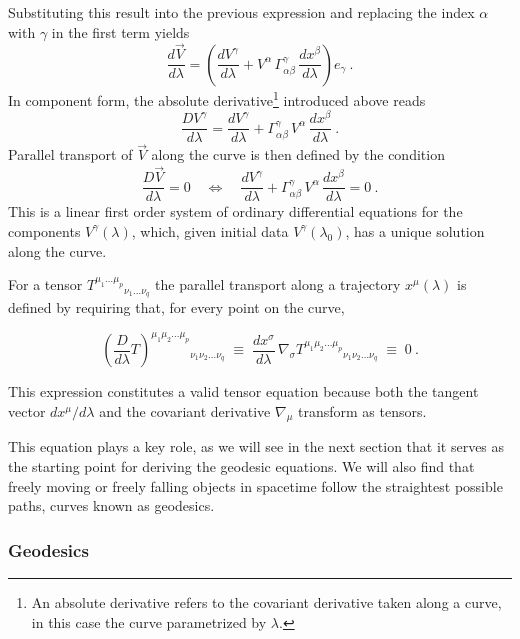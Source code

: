 Substituting this result into the previous expression and replacing the index $\alpha$ with $\gamma$ in the first term yields
\begin{equation}
\frac{d\vec{V}}{d\lambda}
= \left(\frac{dV^\gamma}{d\lambda} + V^\alpha\,\Gamma^\gamma_{\alpha\beta}\,\frac{dx^\beta}{d\lambda}\right) e_\gamma \ .
\end{equation}
In component form, the absolute derivative\footnote{An absolute derivative refers to the covariant derivative taken along a curve, in this case the curve parametrized by $\lambda$.
} introduced above reads
\begin{equation}
\frac{D V^\gamma}{d\lambda} = \frac{dV^\gamma}{d\lambda} + \Gamma^\gamma_{\alpha\beta}\,V^\alpha\,\frac{dx^\beta}{d\lambda} \ .
\label{absolutederivative}
\end{equation}
Parallel transport of $\vec{V}$ along the curve is then defined by the condition
\begin{equation}
\frac{D\vec{V}}{d\lambda} = 0
\quad\Longleftrightarrow\quad
\frac{dV^\gamma}{d\lambda} + \Gamma^\gamma_{\alpha\beta}\,V^\alpha\,\frac{dx^\beta}{d\lambda} = 0 \ .
\end{equation}
This is a linear first order system of ordinary differential equations for the components $V^\gamma(\lambda)$, which, given initial data $V^\gamma(\lambda_0)$, has a unique solution along the curve.

For a tensor $T^{\mu_1\ldots\mu_p}{}_{\nu_1\ldots\nu_q}$ the parallel transport along a trajectory $x^\mu(\lambda)$ is defined by requiring that, for every point on the curve,

\begin{equation}
\left( \frac{D}{d\lambda} T \right)^{\mu_1\mu_2\ldots\mu_p}{}_{\nu_1\nu_2\ldots\nu_q}
\; \equiv \; \frac{dx^\sigma}{d\lambda} \, \nabla_\sigma T^{\mu_1\mu_2\ldots\mu_p}{}_{\nu_1\nu_2\ldots\nu_q} \; \equiv \; 0 \ .
\end{equation}

This expression constitutes a valid tensor equation because both the tangent vector $dx^\mu/d\lambda$ and the covariant derivative $\nabla_\mu$ transform as tensors. 
    
This equation plays a key role, as we will see in the next section that it serves as the starting point for deriving the geodesic equations. We will also find that freely moving or freely falling objects in spacetime follow the straightest possible paths, curves known as geodesics.


\subsubsection{Geodesics}
\label{Geodesics and curvature}


